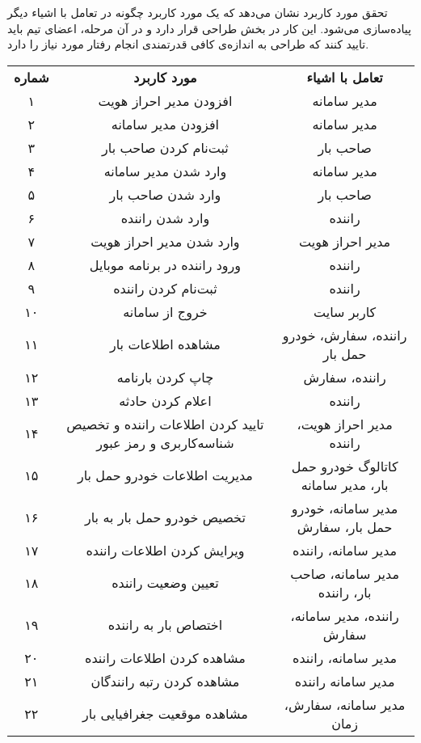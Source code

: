 
تحقق مورد کاربرد  نشان می‌دهد که یک مورد کاربرد چگونه در تعامل با اشیاء دیگر پیاده‌سازی می‌شود. این کار در بخش طراحی قرار دارد و در آن مرحله، اعضای تیم باید تایید کنند که طراحی به اندازه‌ی کافی قدرتمندی انجام رفتار مورد نیاز را دارد.

\begin{table}
	\centering
	\begin{longtable}{|c|c|c|}
		\cline{1-3}
		\textbf{شماره} & \textbf{مورد کاربرد} & \textbf{تعامل با اشیاء} \\ \cline{1-3}
	۱ & افزودن مدیر احراز هویت & مدیر سامانه \\
	۲ & افزودن مدیر سامانه & مدیر سامانه \\ 
	۳ & ثبت‌نام کردن صاحب بار & صاحب بار \\
	۴ & وارد شدن مدیر سامانه & مدیر سامانه \\
	۵ & وارد شدن صاحب بار & صاحب بار \\
	۶ & وارد شدن راننده & راننده \\
	۷ & وارد شدن مدیر احراز هویت & مدیر احراز هویت \\
	۸ & ورود راننده در برنامه موبایل & راننده \\
	۹ & ثبت‌نام کردن راننده & راننده \\
	۱۰ & خروج از سامانه & کاربر سایت \\
	۱۱ & مشاهده اطلاعات بار & راننده، سفارش، خودرو حمل بار \\
	۱۲ & چاپ کردن بارنامه & راننده، سفارش \\
	۱۳ & اعلام کردن حادثه & راننده \\
	۱۴ & تایید کردن اطلاعات راننده و تخصیص شناسه‌کاربری و رمز عبور & مدیر احراز هویت، راننده \\ 
	۱۵ & مدیریت اطلاعات خودرو حمل بار & کاتالوگ خودرو حمل بار،‌ مدیر سامانه \\
	۱۶ & تخصیص خودرو حمل بار به بار & مدیر سامانه، خودرو حمل بار، سفارش \\
	۱۷ & ویرایش کردن اطلاعات راننده & مدیر سامانه، راننده \\
	۱۸ & تعیین وضعیت راننده & مدیر سامانه، صاحب بار، راننده \\
	۱۹ & اختصاص بار به راننده & راننده، مدیر سامانه، سفارش \\
	۲۰ & مشاهده کردن اطلاعات راننده & مدیر سامانه، راننده \\
	۲۱ & مشاهده کردن رتبه رانندگان & مدیر سامانه راننده \\
	۲۲ & مشاهده موقعیت جغرافیایی بار & مدیر سامانه، سفارش، زمان \\

\end{longtable}
\end{table}
